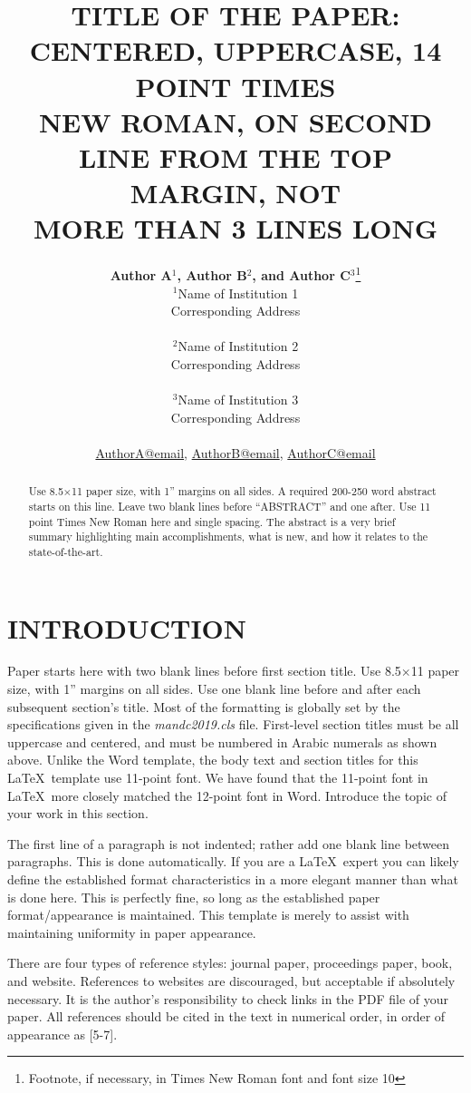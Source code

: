 \documentclass[letterpaper]{mandc2019}
\title{TITLE OF THE PAPER: CENTERED, UPPERCASE, 14 POINT TIMES \\
  NEW ROMAN, ON SECOND LINE FROM THE TOP MARGIN, NOT \\
  MORE THAN 3 LINES LONG}
\author{%
  \textbf{Author A$^1$, Author B$^2$, and Author C$^3$}\footnote{Footnote, if necessary, in Times New Roman font and font size 10} \\
  $^1$Name of Institution 1  \\
  Corresponding Address \\ 
\\
  $^2$Name of Institution 2  \\ 
    Corresponding Address \\ 
\\
  $^3$Name of Institution 3  \\
     Corresponding Address \\
     \\
  \url{AuthorA@email}, \url{AuthorB@email}, \url{AuthorC@email}
}
\begin{document}
\maketitle
\justify 

\begin{abstract}
  Use 8.5$\times$11 paper size, with 1'' margins on all sides.  A required 200-250 
  word abstract starts on this line.  Leave two blank lines before ``ABSTRACT''
  and one after.  Use 11 point Times New Roman here and single 
  spacing. The abstract is a very brief summary highlighting main 
  accomplishments, what is new, and how it relates to the state-of-the-art.
\end{abstract}

\section{INTRODUCTION} 
Paper starts here with two blank lines before first section title.  Use 
8.5$\times$11 paper size, with 1'' margins on all sides.  Use one blank line 
before and after each subsequent section’s title.  Most of the formatting is globally
set by the specifications given in the \emph{mandc2019.cls} file.  
First-level section titles must be all uppercase and centered, and must 
be numbered in Arabic numerals as shown above.  Unlike the Word template, the body text and section titles for this \LaTeX\ template use 
11-point font.  We have found that the 11-point font in \LaTeX\ more closely 
matched the 12-point font in Word.  Introduce the topic of your work 
in this section.

The first line of a paragraph is not indented; rather add one blank line between 
paragraphs.  This is done automatically. If you are a \LaTeX\ expert you 
can likely define the established format characteristics in a more elegant 
manner than what is done here.  This is perfectly fine, so long as the 
established paper format/appearance is maintained.  This template is merely 
to assist with maintaining uniformity in paper appearance.

There are four types of reference styles: journal paper\cite{journal}, 
proceedings paper\cite{proc_paper}, book\cite{book}, and website\cite{website}.
References to websites are discouraged, but acceptable if absolutely necessary. It 
is the author’s responsibility to check links in the PDF file of your paper. 
All references should be cited in the text in numerical order, in order of 
appearance as [5-7].
\end{document}
